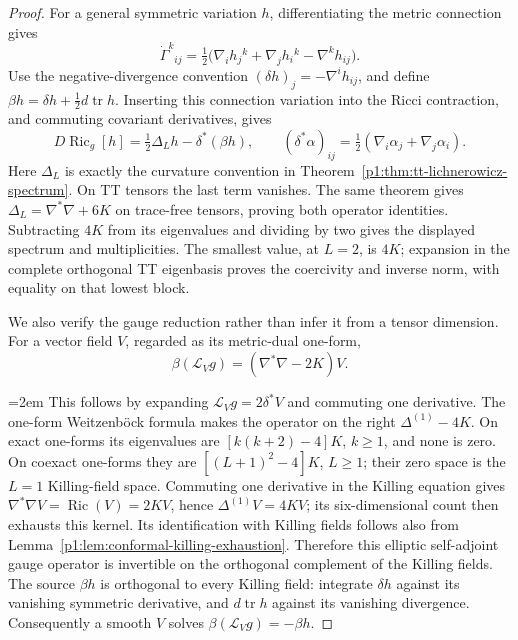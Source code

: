 \documentclass[11pt]{article}
\begin{document}
\begin{proof}
For a general symmetric variation \(h\), differentiating the metric
connection gives
\[
 \dot\Gamma^k{}_{ij}
 =\tfrac12\bigl(\nabla_i h_j{}^k+\nabla_j h_i{}^k
                          -\nabla^k h_{ij}\bigr).
\]
Use the negative-divergence convention
\( (\delta h)_j=-\nabla^i h_{ij}\), and define
\(\beta h=\delta h+\tfrac12d\operatorname{tr}h\).
Inserting this connection variation into the Ricci contraction, and
commuting covariant derivatives, gives
\[
 D\operatorname{Ric}_g[h]
 =\tfrac12\Delta_Lh-\delta^*(\beta h),
 \qquad
 (\delta^*\alpha)_{ij}=\tfrac12(\nabla_i\alpha_j+\nabla_j\alpha_i).
\]
Here \(\Delta_L\) is exactly the curvature convention in
Theorem~\ref{p1:thm:tt-lichnerowicz-spectrum}.  On TT tensors the last
term vanishes.  The same theorem gives
\(\Delta_L=\nabla^*\nabla+6K\) on trace-free tensors, proving both operator
identities.  Subtracting \(4K\) from its eigenvalues and dividing by two
gives the displayed spectrum and multiplicities.  The smallest value,
at \(L=2\), is \(4K\); expansion in the complete orthogonal TT eigenbasis
proves the coercivity and inverse norm, with equality on that lowest block.

We also verify the gauge reduction rather than infer it from a tensor
dimension.  For a vector field \(V\), regarded as its metric-dual one-form,
\[
 \beta(\mathcal L_Vg)=(\nabla^*\nabla-2K)V.
\]
{\emergencystretch=2em
This follows by expanding \(\mathcal L_Vg=2\delta^*V\) and commuting one
derivative.  The one-form Weitzenb\"ock formula makes the operator on the
right \(\Delta^{(1)}-4K\).  On exact one-forms its eigenvalues are
\([k(k+2)-4]K\), \(k\ge1\), and none is zero.  On coexact one-forms they
are \([(L+1)^2-4]K\), \(L\ge1\); their zero space is the \(L=1\)
Killing-field space. Commuting one derivative in the Killing equation
gives $\nabla^*\nabla V=\operatorname{Ric}(V)=2KV$, hence
$\Delta^{(1)}V=4KV$; its six-dimensional count then exhausts this kernel.
Its identification with Killing fields follows also from
Lemma~\ref{p1:lem:conformal-killing-exhaustion}.  Therefore this elliptic
self-adjoint gauge operator is invertible on the orthogonal complement of
the Killing fields.  The source \(\beta h\) is orthogonal to every Killing
field: integrate \(\delta h\) against its vanishing symmetric derivative,
and \(d\operatorname{tr}h\) against its vanishing divergence.  Consequently
a smooth \(V\) solves
\(\beta(\mathcal L_Vg)=-\beta h\).\par}


\end{proof}
\end{document}
